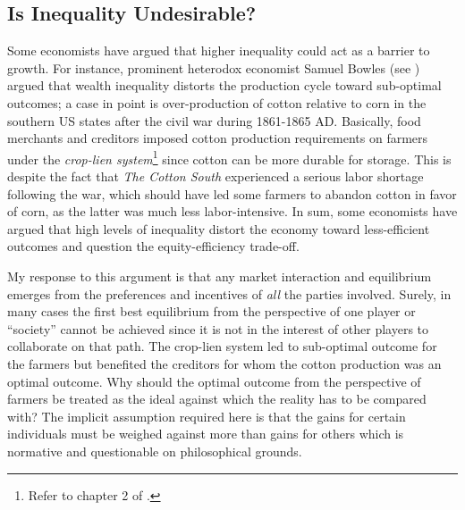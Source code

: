 \documentclass[12pt]{article}
\newcommand{\1}{\mathbbm 1}
\begin{document}
	    
	    
	    \subsection{Is Inequality Undesirable?}
	    
	    
	    
	    Some economists have argued that higher inequality could act as a barrier to growth. For instance, prominent heterodox economist Samuel Bowles (see \cite{bowles2012new}) argued that wealth inequality distorts the production cycle toward sub-optimal outcomes; a case in point is over-production of cotton relative to corn in the southern US states after the civil war during 1861-1865 AD. Basically, food merchants and creditors imposed cotton production requirements on farmers under the \textit{crop-lien system}\footnote{Refer to chapter 2 of \cite{bowles2012new}.} since cotton can be more durable for storage. This is despite the fact that \textit{The Cotton South} experienced a serious labor shortage following the war, which should have led some farmers to abandon cotton in favor of corn, as the latter was much less labor-intensive. In sum, some economists have argued that high levels of inequality distort the economy toward less-efficient outcomes and question the equity-efficiency trade-off. 
	    
	    My response to this argument is that any market interaction and equilibrium emerges from the preferences and incentives of \textit{all} the parties involved. Surely, in many cases the first best equilibrium from the perspective of one player or ``society'' cannot be achieved since it is not in the interest of other players to collaborate on that path. The crop-lien system led to sub-optimal outcome for the farmers but benefited the creditors for whom the cotton production was an optimal outcome. Why should the optimal outcome from the perspective of farmers be treated as the ideal against which the reality has to be compared with? The implicit assumption required here is that the gains for certain individuals must be weighed against more than gains for others which is normative and questionable on philosophical grounds.
	    
\end{document}
